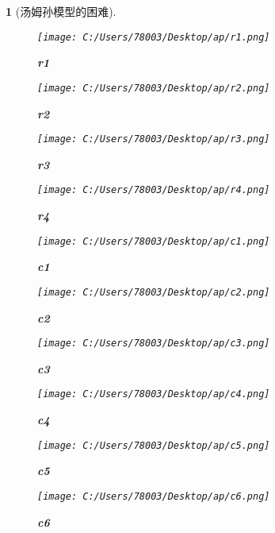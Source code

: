 \documentclass[UTF8]{report}
\theoremstyle{MyLineTheoremStyle} %
\theoremstyle{MyBlockTheoremStyle} %
\theoremstyle{MySubsubsectionStyle} %
\newtheorem{definition}{}
\begin{document}
\begin{definition}[汤姆孙模型的困难]
    \begin{figure}[ht]
        \centering
        \texttt{[image: C:/Users/78003/Desktop/ap/r1.png]}
        \caption{\textbf{r1}}
        \label{fig:r1}
    \end{figure}
    \begin{figure}[ht]
        \centering
        \texttt{[image: C:/Users/78003/Desktop/ap/r2.png]}
        \caption{\textbf{r2}}
        \label{fig:r2}
    \end{figure}
    \begin{figure}[ht]
        \centering
        \texttt{[image: C:/Users/78003/Desktop/ap/r3.png]}
        \caption{\textbf{r3}}
        \label{fig:r3}
    \end{figure}
    \begin{figure}[ht]
        \centering
        \texttt{[image: C:/Users/78003/Desktop/ap/r4.png]}
        \caption{\textbf{r4}}
        \label{fig:r4}
    \end{figure}
    \begin{figure}[ht]
        \centering
        \texttt{[image: C:/Users/78003/Desktop/ap/c1.png]}
        \caption{\textbf{c1}}
        \label{fig:c1}
    \end{figure}
    \begin{figure}[ht]
        \centering
        \texttt{[image: C:/Users/78003/Desktop/ap/c2.png]}
        \caption{\textbf{c2}}
        \label{fig:c2}
    \end{figure}
    \begin{figure}[ht]
        \centering
        \texttt{[image: C:/Users/78003/Desktop/ap/c3.png]}
        \caption{\textbf{c3}}
        \label{fig:c3}
    \end{figure}
    \begin{figure}[ht]
        \centering
        \texttt{[image: C:/Users/78003/Desktop/ap/c4.png]}
        \caption{\textbf{c4}}
        \label{fig:c4}
    \end{figure}
    \begin{figure}[ht]
        \centering
        \texttt{[image: C:/Users/78003/Desktop/ap/c5.png]}
        \caption{\textbf{c5}}
        \label{fig:c5}
    \end{figure}
    \begin{figure}[ht]
        \centering
        \texttt{[image: C:/Users/78003/Desktop/ap/c6.png]}
        \caption{\textbf{c6}}

\end{figure}
\end{definition}
\end{document}
